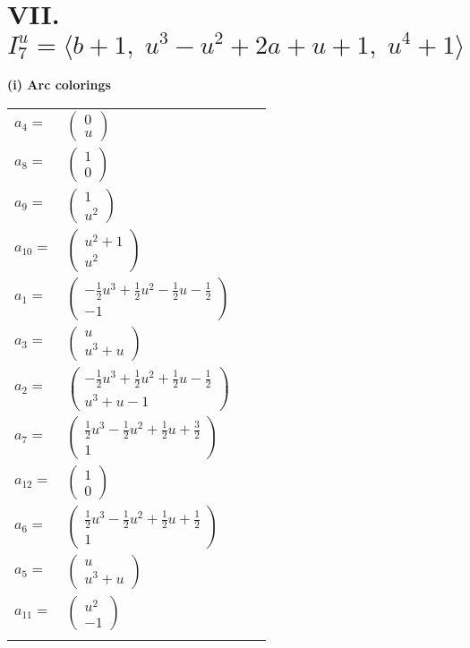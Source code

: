 \documentclass[1p]{elsarticle_modified}
\theoremstyle{definition}
\begin{document}
\centering \section*{VII. $I^u_{7}= \langle b+1,\;u^3- u^2+2 a+u+1,\;u^4+1 \rangle$}
\flushleft \textbf{(i) Arc colorings}\\
\begin{tabular}{m{7pt} m{180pt} m{7pt} m{180pt} }
\flushright $a_{4}=$&$\begin{pmatrix}0\\u\end{pmatrix}$ \\
\flushright $a_{8}=$&$\begin{pmatrix}1\\0\end{pmatrix}$ \\
\flushright $a_{9}=$&$\begin{pmatrix}1\\u^2\end{pmatrix}$ \\
\flushright $a_{10}=$&$\begin{pmatrix}u^2+1\\u^2\end{pmatrix}$ \\
\flushright $a_{1}=$&$\begin{pmatrix}-\frac{1}{2} u^3+\frac{1}{2} u^2-\frac{1}{2} u-\frac{1}{2}\\-1\end{pmatrix}$ \\
\flushright $a_{3}=$&$\begin{pmatrix}u\\u^3+u\end{pmatrix}$ \\
\flushright $a_{2}=$&$\begin{pmatrix}-\frac{1}{2} u^3+\frac{1}{2} u^2+\frac{1}{2} u-\frac{1}{2}\\u^3+u-1\end{pmatrix}$ \\
\flushright $a_{7}=$&$\begin{pmatrix}\frac{1}{2} u^3-\frac{1}{2} u^2+\frac{1}{2} u+\frac{3}{2}\\1\end{pmatrix}$ \\
\flushright $a_{12}=$&$\begin{pmatrix}1\\0\end{pmatrix}$ \\
\flushright $a_{6}=$&$\begin{pmatrix}\frac{1}{2} u^3-\frac{1}{2} u^2+\frac{1}{2} u+\frac{1}{2}\\1\end{pmatrix}$ \\
\flushright $a_{5}=$&$\begin{pmatrix}u\\u^3+u\end{pmatrix}$ \\
\flushright $a_{11}=$&$\begin{pmatrix}u^2\\-1\end{pmatrix}$\\&\end{tabular}
\end{document}
